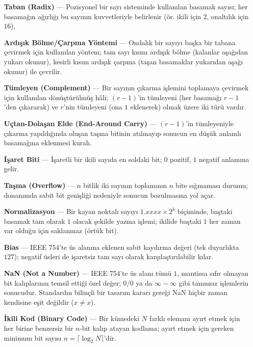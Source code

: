 
\textbf{Taban (Radix)} --- Pozisyonel bir sayı sisteminde kullanılan basamak sayısı; her
basamağın ağırlığı bu sayının kuvvetleriyle belirlenir (ör. ikili için $2$, onaltılık için
$16$).

\textbf{Ardışık Bölme/Çarpma Yöntemi} --- Ondalık bir sayıyı başka bir tabana çevirmek için
kullanılan yöntem; tam sayı kısmı ardışık bölme (kalanlar aşağıdan yukarı okunur), kesirli
kısım ardışık çarpma (taşan basamaklar yukarıdan aşağı okunur) ile çevrilir.

\textbf{Tümleyen (Complement)} --- Bir sayının çıkarma işlemini toplamaya çevirmek için
kullanılan dönüştürülmüş hâli; $(r{-}1)$'in tümleyeni (her basamağı $r{-}1$'den çıkararak) ve
$r$'nin tümleyeni (ona $1$ eklenerek) olmak üzere iki türü vardır.

\textbf{Uçtan-Dolaşan Elde (End-Around Carry)} --- $(r{-}1)$'in tümleyeniyle çıkarma
yapıldığında oluşan taşma bitinin atılmayıp sonucun en düşük anlamlı basamağına eklenmesi
kuralı.

\textbf{İşaret Biti} --- İşaretli bir ikili sayıda en soldaki bit; $0$ pozitif, $1$ negatif
anlamına gelir.

\textbf{Taşma (Overflow)} --- $n$ bitlik iki sayının toplamının $n$ bite sığmaması durumu;
donanımda sabit bit genişliği nedeniyle sonucun bozulmasına yol açar.

\textbf{Normalizasyon} --- Bir kayan noktalı sayıyı $1.xxxx\times2^k$ biçiminde, baştaki
basamak tam olarak $1$ olacak şekilde yazma işlemi; ikilide baştaki $1$ her zaman var olduğu
için saklanmaz (örtük bit).

\textbf{Bias} --- IEEE 754'te üs alanına eklenen sabit kaydırma değeri (tek duyarlıkta
$127$); negatif üsleri de işaretsiz tam sayı olarak karşılaştırılabilir kılar.

\textbf{NaN (Not a Number)} --- IEEE 754'te üs alanı tümü $1$, mantissa sıfır olmayan bit
kalıplarının temsil ettiği özel değer; $0/0$ ya da $\infty-\infty$ gibi tanımsız işlemlerin
sonucudur. Standardın bilinçli bir tasarım kararı gereği NaN hiçbir zaman kendisine eşit
değildir ($x\neq x$).

\textbf{İkili Kod (Binary Code)} --- Bir kümedeki $N$ farklı elemanı ayırt etmek için her
birine benzersiz bir $n$-bit kalıp atayan kodlama; ayırt etmek için gereken minimum bit
sayısı $n=\lceil\log_2 N\rceil$'dir.

